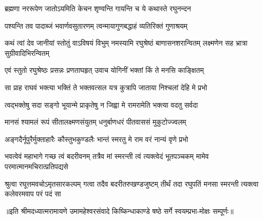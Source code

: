 \twolineshloka
{ब्रह्मणा नररूपेण जातोऽयमिति केचन}
{शृण्वन्ति गायन्ति च ये कथास्ते रघुनन्दन} %

\twolineshloka
{पश्यन्ति तव पादाब्जं भवार्णवसुतारणम्}
{त्वन्मायागुणबद्धाहं व्यतिरिक्तं गुणाश्रयम्} %

\threelineshloka
{कथं त्वां देव जानीयां स्तोतुं वाऽविषयं विभुम्}
{नमस्यामि रघुश्रेष्ठं बाणासनशरान्वितम्}
{लक्ष्मणेन सह भ्रात्रा सुग्रीवादिभिरन्वितम्} %

\twolineshloka
{एवं स्तुतो रघुश्रेष्ठः प्रसन्नः प्रणताघहृत्}
{उवाच योगिनीं भक्तां किं ते मनसि काङ्क्षितम्} %

\twolineshloka
{सा प्राह राघवं भक्त्या भक्तिं ते भक्तवत्सल}
{यत्र कुत्रापि जाताया निश्चलां देहि मे प्रभो} %

\twolineshloka
{त्वद्भक्तेषु सदा सङ्गो भूयान्मे प्राकृतेषु न}
{जिह्वा मे रामरामेति भक्त्या वदतु सर्वदा} %

\twolineshloka
{मानसं श्यामलं रूपं सीतालक्ष्मणसंयुतम्}
{धनुर्बाणधरं पीतवाससं मुकुटोज्ज्वलम्} %

\twolineshloka
{अङ्गदैर्नूपुरैर्मुक्ताहारैः कौस्तुभकुण्डलैः}
{भान्तं स्मरतु मे राम वरं नान्यं वृणे प्रभो} %


\threelineshloka
{भवत्वेवं महाभागे गच्छ त्वं बदरीवनम्}
{तत्रैव मां स्मरन्ती त्वं त्यक्त्वेदं भूतपञ्चकम्}
{मामेव परमात्मानमचिरात्प्रतिपद्यसे} %

\fourlineindentedshloka
{श्रुत्वा रघूत्तमवचोऽमृतसारकल्पम्}
{गत्वा तदैव बदरीतरुखण्डजुष्टम्}
{तीर्थं तदा रघुपतिं मनसा स्मरन्ती}
{त्यक्त्वा कलेवरमवाप परं पदं सा} %

{॥इति श्रीमदध्यात्मरामायणे उमामहेश्वरसंवादे किष्किन्धाकाण्डे
षष्ठे सर्गे स्वयम्प्रभा-मोक्षः सम्पूर्णः॥}
